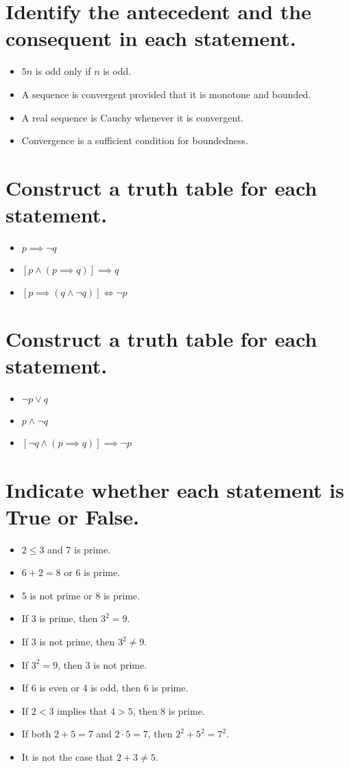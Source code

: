 \documentclass[11pt]{article} %
\begin{document}
\section{Identify the antecedent and the consequent in each statement.}
\begin{itemize}
	\item$5n$ is odd only if $n$ is odd.
	\item A sequence is convergent provided that it is monotone and bounded.
	\item A real sequence is Cauchy whenever it is convergent.
	\item Convergence is a sufficient condition for boundedness.
\end{itemize}

\section{Construct a truth table for each statement.}
\begin{itemize}
	\item $p \implies \neg q$
	\item $[p \land (p \implies q)] \implies q$
	\item $[p \implies (q \land \neg q)] \iff \neg p$
\end{itemize}

\section{Construct a truth table for each statement.}
\begin{itemize}
	\item $\neg p \lor q$
	\item $p \land \neg q$
	\item $[\neg q \land (p \implies q)] \implies \neg p$
\end{itemize}

\section{Indicate whether each statement is True or False.}
\begin{itemize}
	\item $2 \leq 3$ and 7 is prime.
	\item $6+2=8$ or 6 is prime.
	\item 5 is not prime or 8 is prime.
	\item If 3 is prime, then $3^2=9$.
	\item If 3 is not prime, then $3^2 \neq 9$.
	\item If $3^2 = 9$, then 3 is not prime.
	\item If 6 is even or 4 is odd, then 6 is prime.
	\item If $2<3$ implies that $4>5$, then 8 is prime.
	\item If both $2+5=7$ and $2\cdot5=7$, then $2^2 + 5^2 = 7^2$.
	\item It is not the case that $2+3\neq5$.
\end{itemize}
\end{document}
